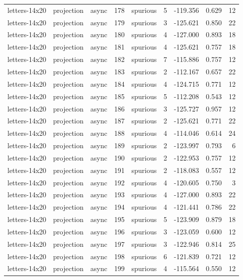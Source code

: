 \begin{tabular}{lllrlrrrr}
letters-14x20 & projection & async & 178 & spurious & 5 & -119.356 & 0.629 & 12 \\
letters-14x20 & projection & async & 179 & spurious & 3 & -125.621 & 0.850 & 22 \\
letters-14x20 & projection & async & 180 & spurious & 4 & -127.000 & 0.893 & 18 \\
letters-14x20 & projection & async & 181 & spurious & 4 & -125.621 & 0.757 & 18 \\
letters-14x20 & projection & async & 182 & spurious & 7 & -115.886 & 0.757 & 12 \\
letters-14x20 & projection & async & 183 & spurious & 2 & -112.167 & 0.657 & 22 \\
letters-14x20 & projection & async & 184 & spurious & 4 & -124.715 & 0.771 & 12 \\
letters-14x20 & projection & async & 185 & spurious & 5 & -112.208 & 0.543 & 12 \\
letters-14x20 & projection & async & 186 & spurious & 3 & -125.727 & 0.957 & 12 \\
letters-14x20 & projection & async & 187 & spurious & 2 & -125.621 & 0.771 & 22 \\
letters-14x20 & projection & async & 188 & spurious & 4 & -114.046 & 0.614 & 24 \\
letters-14x20 & projection & async & 189 & spurious & 2 & -123.997 & 0.793 & 6 \\
letters-14x20 & projection & async & 190 & spurious & 2 & -122.953 & 0.757 & 12 \\
letters-14x20 & projection & async & 191 & spurious & 2 & -118.083 & 0.557 & 12 \\
letters-14x20 & projection & async & 192 & spurious & 4 & -120.605 & 0.750 & 3 \\
letters-14x20 & projection & async & 193 & spurious & 4 & -127.000 & 0.893 & 22 \\
letters-14x20 & projection & async & 194 & spurious & 4 & -121.441 & 0.786 & 22 \\
letters-14x20 & projection & async & 195 & spurious & 5 & -123.909 & 0.879 & 18 \\
letters-14x20 & projection & async & 196 & spurious & 3 & -123.059 & 0.600 & 12 \\
letters-14x20 & projection & async & 197 & spurious & 3 & -122.946 & 0.814 & 25 \\
letters-14x20 & projection & async & 198 & spurious & 6 & -121.839 & 0.721 & 12 \\
letters-14x20 & projection & async & 199 & spurious & 4 & -115.564 & 0.550 & 12 \\
\bottomrule
\end{tabular}
